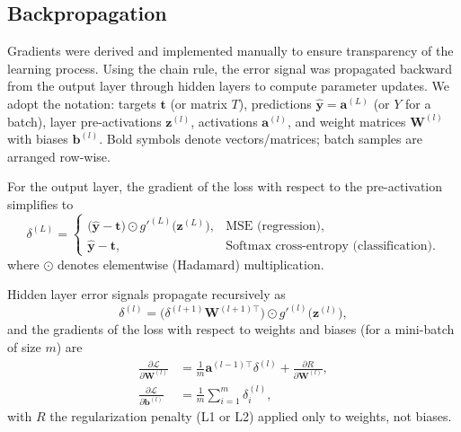 \documentclass[amssymb,twocolumn,aps]{revtex4}
\begin{document}
\subsection{Backpropagation}
\label{subsec:backpropagation}
Gradients were derived and implemented manually to ensure transparency of the learning process. Using the chain rule, the error signal was propagated backward from the output layer through hidden layers to compute parameter updates. We adopt the notation: targets $\mathbf{t}$ (or matrix $T$), predictions $\hat{\mathbf{y}} = \mathbf{a}^{(L)}$ (or $Y$ for a batch), layer pre-activations $\mathbf{z}^{(l)}$, activations $\mathbf{a}^{(l)}$, and weight matrices $\mathbf{W}^{(l)}$ with biases $\mathbf{b}^{(l)}$. Bold symbols denote vectors/matrices; batch samples are arranged row-wise.

For the output layer, the gradient of the loss with respect to the pre-activation simplifies to
\begin{equation}
\label{eq:delta_output_alt}
\delta^{(L)} =
\begin{cases}
\bigl(\hat{\mathbf{y}} - \mathbf{t}\bigr) \odot g'^{(L)}\!\bigl(\mathbf{z}^{(L)}\bigr), & \text{MSE (regression)},\\[4pt]
\hat{\mathbf{y}} - \mathbf{t}, & \text{Softmax cross-entropy (classification)}.
\end{cases}
\end{equation}
where $\odot$ denotes elementwise (Hadamard) multiplication.

Hidden layer error signals propagate recursively as
\[
\delta^{(l)} = \bigl(\delta^{(l+1)} \mathbf{W}^{(l+1)\top}\bigr) \odot g'^{(l)}\!\bigl(\mathbf{z}^{(l)}\bigr),
\]
and the gradients of the loss with respect to weights and biases (for a mini-batch of size $m$) are
\begin{align*}
\frac{\partial \mathcal{L}}{\partial \mathbf{W}^{(l)}} &= \frac{1}{m} \mathbf{a}^{(l-1)\top} \delta^{(l)} + \frac{\partial R}{\partial \mathbf{W}^{(l)}},\\
\frac{\partial \mathcal{L}}{\partial \mathbf{b}^{(l)}} &= \frac{1}{m} \sum_{i=1}^{m} \delta^{(l)}_i,
\end{align*}
with $R$ the regularization penalty (L1 or L2) applied only to weights, not biases.
\end{document}

